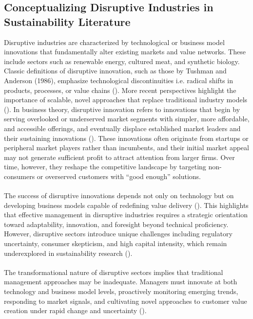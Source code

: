 	\subsection{Conceptualizing Disruptive Industries in Sustainability Literature}
	Disruptive industries are characterized by technological or business model innovations that fundamentally alter existing markets and value networks. These include sectors such as renewable energy, cultured meat, and synthetic biology. Classic definitions of disruptive innovation, such as those by Tushman and Anderson (1986), emphasize technological discontinuities i.e. radical shifts in products, processes, or value chains (\textcite{Tushman1986}). More recent perspectives highlight the importance of scalable, novel approaches that replace traditional industry models (\textcite{Yu2010}). In business theory, disruptive innovation refers to innovations that begin by serving overlooked or underserved market segments with simpler, more affordable, and accessible offerings, and eventually displace established market leaders and their sustaining innovations (\textcite{Christensen1997}). These innovations often originate from startups or peripheral market players rather than incumbents, and their initial market appeal may not generate sufficient profit to attract attention from larger firms. Over time, however, they reshape the competitive landscape by targeting non-consumers or overserved customers with “good enough” solutions.
	
	\paragraph*{} The success of disruptive innovations depends not only on technology but on developing business models capable of redefining value delivery (\textcite{Chesbrough2007}). This highlights that effective management in disruptive industries requires a strategic orientation toward adaptability, innovation, and foresight beyond technical proficiency. However, disruptive sectors introduce unique challenges including regulatory uncertainty, consumer skepticism, and high capital intensity, which remain underexplored in sustainability research (\textcite{Wustenhagen2007}).
	
	\paragraph*{} The transformational nature of disruptive sectors implies that traditional management approaches may be inadequate. Managers must innovate at both technology and business model levels, proactively monitoring emerging trends, responding to market signals, and cultivating novel approaches to customer value creation under rapid change and uncertainty (\textcite{Teece2007}).
	
